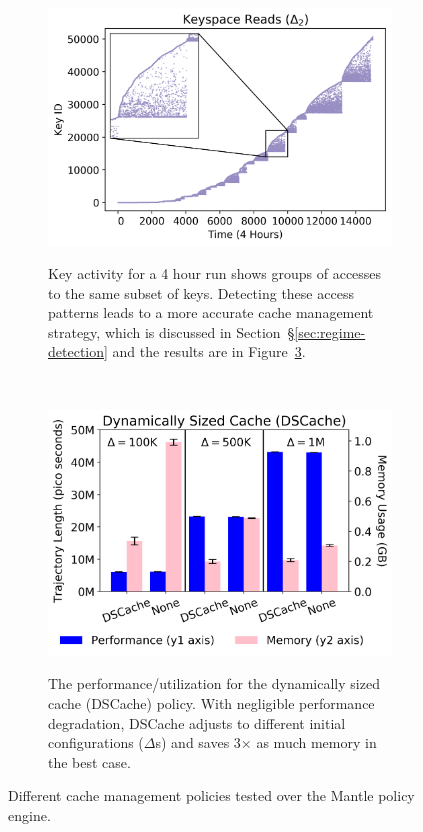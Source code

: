\begin{figure}[t!]
    \begin{subfigure}[t]{0.48\textwidth}
        \centering
	\includegraphics[width=1\textwidth]{figures/keyspace-zoomed.png}\\

\caption{Key activity for a 4 hour run shows groups of accesses to the same
subset of keys. Detecting these access patterns leads to a more accurate cache
management strategy, which is discussed in Section~\S\ref{sec:regime-detection}
and the results are in Figure~\ref{fig:dscache-vs-none}.
\label{fig:keyspace-zoomed}}
    \end{subfigure}%
    ~ 
    \begin{subfigure}[t]{0.48\textwidth}
        \centering
        \includegraphics[width=1\textwidth]{figures/dscache-vs-none.png}\\
	\caption{The performance/utilization for the dynamically sized cache (DSCache)
policy. With negligible performance degradation, DSCache adjusts to different initial configurations
(\(\Delta\)s) and saves 3\(\times\) as much memory in the best case.
\label{fig:dscache-vs-none}}
    \end{subfigure}%
    \caption{Different cache management policies tested over the Mantle policy engine.}
\end{figure}

